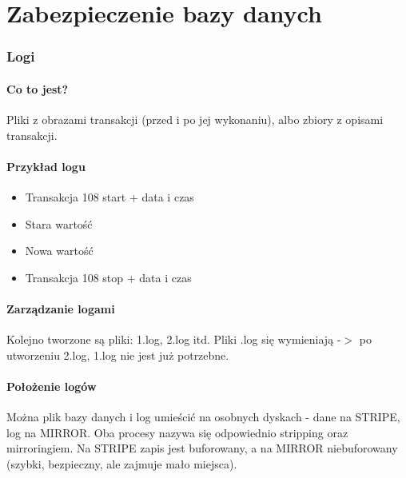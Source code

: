 \documentclass[a4paper,twoside]{article}
\begin{document}
  	\part*{Zabezpieczenie bazy danych}
  	
  	\section*{Logi}
  	\subsection*{Co to jest?}
  	Pliki z obrazami transakcji (przed i po jej wykonaniu), albo zbiory z opisami transakcji.
  	\subsection*{Przykład logu}
  	\begin{itemize}
  		\item Transakcja 108 start  + data i czas
  		\item Stara wartość
  		\item Nowa wartość
  		\item Transakcja 108 stop + data i czas
  	\end{itemize}
  	\subsection*{Zarządzanie logami}
  	Kolejno tworzone są pliki: 1.log, 2.log itd. Pliki .log się wymieniają -$ > $ po utworzeniu 2.log, 1.log nie jest już potrzebne.
  	\subsection*{Położenie logów}
  	Można plik bazy danych i log umieścić na osobnych dyskach - dane na STRIPE, log na MIRROR. Oba procesy nazywa się odpowiednio stripping oraz mirroringiem. Na STRIPE zapis jest buforowany, a na MIRROR niebuforowany (szybki, bezpieczny, ale zajmuje mało miejsca).
  	
\end{document}
